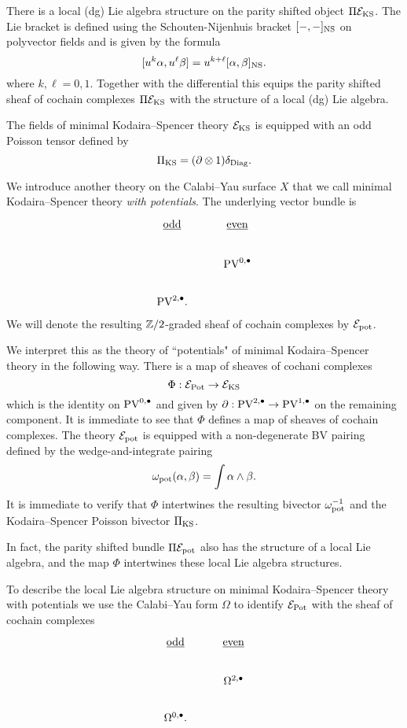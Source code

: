 \documentclass[11pt]{article}
\newcommand\bu{\bullet}
\begin{document}
There is a local (dg) Lie algebra structure on the parity shifted object $\Pi \mathcal{E}_{\rm KS}$. 
The Lie bracket is defined using the Schouten-Nijenhuis bracket $[-,-]_{\rm NS}$ on polyvector fields and is given by the formula
\[
[u^k \alpha , u^\ell \beta] = u^{k+\ell} [\alpha, \beta]_{\rm NS} .
\]
where $k, \ell = 0,1$.
Together with the differential this equips the parity shifted sheaf of cochain complexes $\Pi \mathcal{E}_{\rm KS}$ with the structure of a local (dg) Lie algebra. 

The fields of minimal Kodaira--Spencer theory $\mathcal{E}_{\rm KS}$ is equipped with an odd Poisson tensor defined by 
\[
\Pi_{\rm KS} = (\partial \otimes 1) \delta_{\rm Diag} .
\]

We introduce another theory on the Calabi--Yau surface $X$ that we call minimal Kodaira--Spencer theory {\em with potentials}.
The underlying vector bundle is 
\[
\begin{tikzcd}
\ul{\rm odd} & \ul{\rm even} \\
 & \PV^{0,\bu} \\
 \PV^{2,\bu}  .
\end{tikzcd}
\]
We will denote the resulting $\mathbb{Z}/2$-graded sheaf of cochain complexes by $\mathcal{E}_{\rm pot}$. 

We interpret this as the theory of  ``potentials"  of minimal Kodaira--Spencer theory in the following way. 
There is a map of sheaves of cochani complexes 
\[
\Phi : \mathcal{E}_{\rm Pot} \to \mathcal{E}_{\rm KS}
\]
which is the identity on $\PV^{0,\bu}$ and given by $\partial : \PV^{2,\bu} \to \PV^{1,\bu}$ on the remaining component. 
It is immediate to see that $\Phi$ defines a map of sheaves of cochain complexes. 
The theory $\mathcal{E}_{\rm pot}$ is equipped with a non-degenerate BV pairing defined by the wedge-and-integrate pairing
\[
\omega_{\rm pot} (\alpha, \beta) = \int \alpha \wedge \beta  .
\]
It is immediate to verify that $\Phi$ intertwines the resulting bivector $\omega_{\rm pot}^{-1}$ and the Kodaira--Spencer Poisson bivector $\Pi_{\rm KS}$.

In fact, the parity shifted bundle $\Pi \mathcal{E}_{\rm pot}$ also has the structure of a local Lie algebra, and the map $\Phi$ intertwines these local Lie algebra structures. 

To describe the local Lie algebra structure on minimal Kodaira--Spencer theory with potentials we use the Calabi--Yau form $\Omega$ to identify $\mathcal{E}_{\rm Pot}$ with the sheaf of cochain complexes
\[
\begin{tikzcd}
\ul{\rm odd} & \ul{\rm even} \\
 & \Omega^{2,\bu} \\
 \Omega^{0,\bu}  .
\end{tikzcd}
\]
\end{document}
